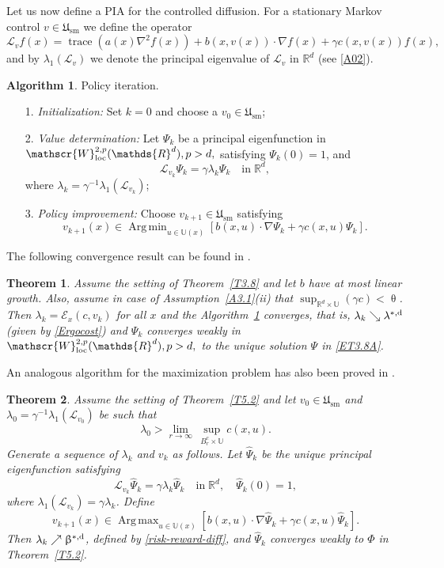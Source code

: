 \documentclass[notitlepage,11pt,reqno]{amsart}
\numberwithin{equation}{section}
\theoremstyle{plain}
\newtheorem{theorem}{Theorem}[section]
\theoremstyle{definition}
\newtheorem{algorithm}{Algorithm}[section]
\theoremstyle{remark}
\newcommand{\Act}{{\mathds{U}}}
\newcommand{\sE}{{\mathscr{E}}}     %
\newcommand{\sL}{{\mathscr{L}}}
\newcommand{\Usm}{\mathfrak{U}_{\mathrm{sm}}}
\newcommand{\lamstrdf}{\lambda^{*,{\rm d}}}
\newcommand{\Rd}{{\mathds{R}^{d}}}
\DeclareMathOperator*{\Argmin}{Arg\,min}
\DeclareMathOperator*{\Argmax}{Arg\,max}
\DeclareMathOperator*{\trace}{trace}
\newcommand{\grad}{\nabla}
\begin{document}
Let us now define a PIA for the controlled diffusion. For a stationary Markov control $v\in \Usm$ we define the operator
$$\sL_v f(x) = \trace(a(x)\grad^2 f(x)) + b(x, v(x))\cdot\grad f(x) + \gamma c(x, v(x)) f(x),$$
and by $\lambda_1(\sL_v)$ we denote the principal eigenvalue of $\sL_v$ in $\Rd$ (see \eqref{A02}). 
\begin{algorithm}\label{Alg-6.2}
Policy iteration.
\begin{itemize}
\item[1.] \textit{Initialization:} Set $k=0$ and choose a $v_0\in\Usm$;
\item[2.] \textit{Value determination:} Let $\Psi_k$ be a principal eigenfunction in $\mathscr{W}^{2,p}_{\rm loc}(\Rd), p>d,$ satisfying $\Psi_k(0)=1$, and 
$$\sL_{v_k} \Psi_k=\gamma \lambda_k \Psi_k\quad \text{in}\; \Rd,$$
where $\lambda_k=\gamma^{-1}\lambda_1(\sL_{v_k})$;
\item[3.] \textit{Policy improvement:} Choose $v_{k+1}\in\Usm$ satisfying
$$v_{k+1}(x)\in \Argmin_{u\in\Act(x)} \left[b(x, u)\cdot\grad \Psi_k + \gamma c(x, u)\Psi_k\right].$$
\end{itemize}
\end{algorithm}
The following convergence result can be found in \cite[Theorem~3.2]{MR4284521}.
\begin{theorem}
Assume the setting of Theorem~\ref{T3.8} and let $b$ have at most linear growth. Also, assume in case of Assumption~\ref{A3.1}(ii) that $\sup_{\Rd\times\Act}(\gamma c)<\uptheta$.
Then $\lambda_k=\sE_x(c, v_k)$ for all $x$ and the Algorithm~\ref{Alg-6.2} converges, that is, $\lambda_k\searrow \lamstrdf$ (given by \eqref{Ergocost}) and
$\Psi_k$ converges weakly in $\mathscr{W}^{2,p}_{\rm loc}(\Rd), p>d,$ to the unique solution $\Psi$ in \eqref{ET3.8A}.
\end{theorem}
An analogous algorithm for the maximization problem has also been proved in \cite[Theorem~4.2]{MR4284521}.
\begin{theorem}
Assume the setting of Theorem~\ref{T5.2} and let $v_0\in\Usm$ and $\lambda_0=\gamma^{-1}\lambda_1(\sL_{v_0})$ be such that
$$\lambda_0> \lim_{r\to\infty} \, \sup_{B^c_r\times\Act} c(x,u).$$
Generate a sequence of  $\lambda_k$ and $v_k$ as follows. Let $\widehat{\Psi}_k$ be the unique principal eigenfunction 
satisfying 
$$\sL_{v_k}\widehat\Psi_k = \gamma \lambda_k \widehat\Psi_k\quad \text{in}\; \Rd, \quad \widehat\Psi_k(0)=1,$$
where $\lambda_1(\sL_{v_k})=\gamma\lambda_k$. Define
$$v_{k+1}(x)\in \Argmax_{u\in\Act(x)} \left[b(x, u)\cdot\grad \widehat\Psi_k + \gamma c(x, u)\widehat\Psi_k\right].$$
Then $\lambda_k\nearrow \upbeta^{*,{\rm d}}$, defined by \eqref{risk-reward-diff}, and $\widehat\Psi_k$ converges weakly to $\Phi$ in Theorem~\ref{T5.2}.
\end{theorem}
\end{document}
